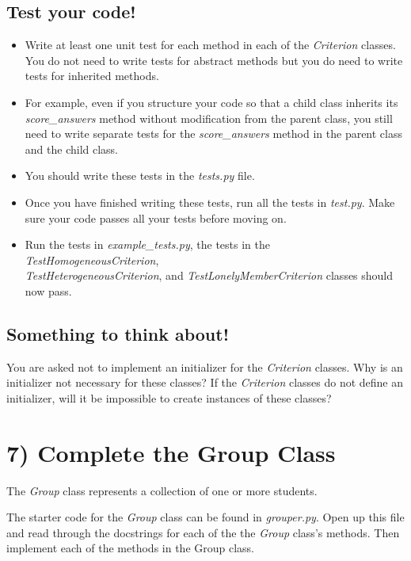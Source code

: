 \documentclass[12pt]{article}
\begin{document}
\subsection*{Test your code!}
\begin{itemize}
    \item Write at least one unit test for each method in each of the \textit{Criterion}
    classes. You do not need to write tests for abstract methods but you do need to
    write tests for inherited methods.

    \item For example, even if you structure your code so that a child class
    inherits its \textit{score\_answers} method without modification from the parent class,
    you still need to write separate tests for the \textit{score\_answers} method in
    the parent class and the child class.

    \item You should write these tests in the \textit{tests.py} file.
    \item Once you have finished writing these tests, run all the tests in \textit{test.py}.
    Make sure your code passes all your tests before moving on.
    \item Run the tests in \textit{example\_tests.py}, the tests in the
    \textit{TestHomogeneousCriterion},\\ \textit{TestHeterogeneousCriterion}, and
    \textit{TestLonelyMemberCriterion} classes should now pass.
\end{itemize}

\subsection*{Something to think about!}
You are asked not to implement an initializer for the \textit{Criterion} classes.
Why is an initializer not necessary for these classes? If the \textit{Criterion}
classes do not define an initializer, will it be impossible to create instances
of these classes?

\section*{7) Complete the Group Class}
The \textit{Group} class represents a collection of one or more students.

The starter code for the \textit{Group} class can be found in \textit{grouper.py}.
Open up this file and read through the docstrings for each of the the \textit{Group}
class’s methods. Then implement each of the methods in the Group class.
\end{document}

